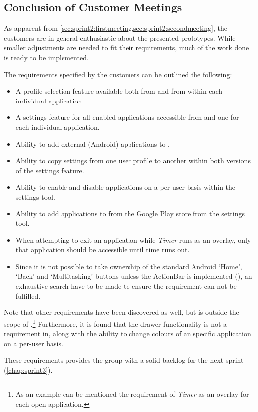 \subsection{Conclusion of Customer Meetings}\label{sec:sprint2:conclusionmeetings}

As apparent from \cref{sec:sprint2:firstmeeting,sec:sprint2:secondmeeting}, the customers are in general enthusiastic about the presented prototypes.
While smaller adjustments are needed to fit their requirements, much of the work done is ready to be implemented.

The requirements specified by the customers can be outlined the following:

\begin{itemize}
\item A profile selection feature available both from \launcher and from within each individual application.
\item A settings feature for all enabled applications accessible from \launcher and one for each individual application.
\item Ability to add external (Android) applications to \launcher.
\item Ability to copy settings from one user profile to another within both versions of the settings feature.
\item Ability to enable and disable applications on a per-user basis within the \launcher settings tool.
\item Ability to add applications to \launcher from the Google Play store from the \launcher settings tool.
\item When attempting to exit an application while \textit{Timer} runs as an overlay, only that application should be accessible until time runs out.
\item Since it is not possible to take ownership of the standard Android `Home', `Back' and `Multitasking' buttons unless the ActionBar is implemented (\citet{onOverridingHomeButtons}), an exhaustive search have to be made to ensure the requirement can not be fulfilled.
\end{itemize}

Note that other requirements have been discovered as well, but is outside the scope of \launcher.\footnote{As an example can be mentioned the requirement of \textit{Timer} as an overlay for each open application.}
Furthermore, it is found that the drawer functionality is not a requirement in, along with the ability to change colours of an specific application on a per-user basis.

These requirements provides the group with a solid backlog for the next sprint (\cref{chap:sprint3}).